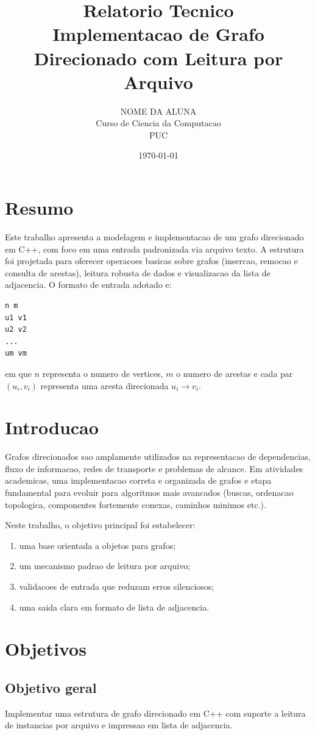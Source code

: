 \documentclass[12pt,a4paper]{article}
\title{Relatorio Tecnico\\Implementacao de Grafo Direcionado com Leitura por Arquivo}
\author{NOME DA ALUNA \\ Curso de Ciencia da Computacao \\ PUC}
\date{\today}
\begin{document}
\maketitle
\tableofcontents
\newpage

\section{Resumo}
Este trabalho apresenta a modelagem e implementacao de um grafo direcionado em C++, com foco em uma entrada padronizada via arquivo texto. A estrutura foi projetada para oferecer operacoes basicas sobre grafos (insercao, remocao e consulta de arestas), leitura robusta de dados e visualizacao da lista de adjacencia. O formato de entrada adotado e:
\begin{verbatim}
n m
u1 v1
u2 v2
...
um vm
\end{verbatim}
em que $n$ representa o numero de vertices, $m$ o numero de arestas e cada par $(u_i, v_i)$ representa uma aresta direcionada $u_i \rightarrow v_i$.

\section{Introducao}
Grafos direcionados sao amplamente utilizados na representacao de dependencias, fluxo de informacao, redes de transporte e problemas de alcance. Em atividades academicas, uma implementacao correta e organizada de grafos e etapa fundamental para evoluir para algoritmos mais avancados (buscas, ordenacao topologica, componentes fortemente conexas, caminhos minimos etc.).

Neste trabalho, o objetivo principal foi estabelecer:
\begin{enumerate}
    \item uma base orientada a objetos para grafos;
    \item um mecanismo padrao de leitura por arquivo;
    \item validacoes de entrada que reduzam erros silenciosos;
    \item uma saida clara em formato de lista de adjacencia.
\end{enumerate}

\section{Objetivos}
\subsection{Objetivo geral}
Implementar uma estrutura de grafo direcionado em C++ com suporte a leitura de instancias por arquivo e impressao em lista de adjacencia.
\end{document}
